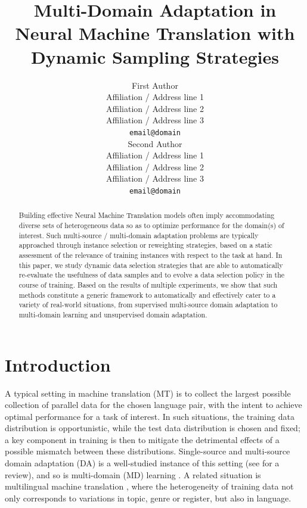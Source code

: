 \documentclass[11pt]{article}
\title{Multi-Domain Adaptation in Neural Machine Translation with Dynamic Sampling Strategies}
\author{First Author \\
  Affiliation / Address line 1 \\
  Affiliation / Address line 2 \\
  Affiliation / Address line 3 \\
  \texttt{email@domain} \\\And
  Second Author \\
  Affiliation / Address line 1 \\
  Affiliation / Address line 2 \\
  Affiliation / Address line 3 \\
  \texttt{email@domain} \\}
\date{}
\newcommand{\fyTodo}[1]{\Todo[FY:]{\textcolor{orange}{#1}}}
\begin{document}
\maketitle
\setlength{\abovedisplayskip}{2pt}
\setlength{\belowdisplayskip}{2pt}
\begin{abstract}
  Building effective Neural Machine Translation models often imply accommodating diverse sets of heterogeneous data so as to optimize performance for the domain(s) of interest. Such multi-source / multi-domain adaptation problems are typically approached through instance selection or reweighting strategies, based on a static assessment of the relevance of training instances with respect to the task at hand. In this paper, we study dynamic data selection strategies that are able to automatically re-evaluate the usefulness of data samples and to evolve a data selection policy in the course of training. Based on the results of multiple experiments, we show that such methods constitute a generic framework to automatically and effectively cater to a variety of real-world situations, from supervised multi-source domain adaptation to multi-domain learning and unsupervised domain adaptation. 
\end{abstract}

\section{Introduction}\label{sec:intro}
A typical setting in machine translation (MT) is to collect the largest possible collection of parallel data for the chosen language pair, with the intent to achieve optimal performance for a task of interest. In such situations, the training data distribution is opportunistic, while the test data distribution is chosen and fixed; a key component in training is then to mitigate the detrimental effects of a possible mismatch between these distributions. Single-source and multi-source domain adaptation (DA) is a well-studied instance of this setting (see \citet{Chu2017comparison} for a review), and so is multi-domain (MD) learning \citep{Chu18multilingual,Zeng18multidomain,Jiang19multidomain,Pham21revisiting}. A related situation is multilingual machine translation \citep{Firat16multiway,Ha16towards,Johnson17google,Arivazhagan19massively}\fyTodo{Add more recent work}, where the heterogeneity of training data not only corresponds to variations in topic, genre or register, but also in language.
\end{document}
